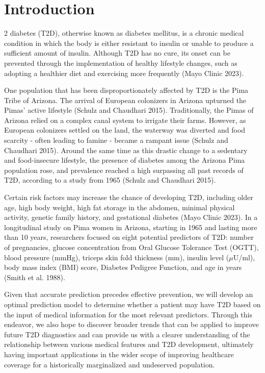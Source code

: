 \documentclass[journal]{IEEEtran}
\begin{document}
\IEEEpeerreviewmaketitle

\section{Introduction}
 2 diabetes (T2D), otherwise known as diabetes mellitus, is a chronic medical condition in which the body is either resistant to insulin or unable to produce a sufficient amount of insulin. Although T2D has no cure, its onset can be prevented through the implementation of healthy lifestyle changes, such as adopting a healthier diet and exercising more frequently (Mayo Clinic 2023).

One population that has been disproportionately affected by T2D is the Pima Tribe of Arizona. The arrival of European colonizers in Arizona upturned the Pimas' active lifestyle (Schulz and Chaudhari 2015). Traditionally, the Pimas of Arizona relied on a complex canal system to irrigate their farms. However, as European colonizers settled on the land, the waterway was diverted and food scarcity - often leading to famine - became a rampant issue (Schulz and Chaudhari 2015). Around the same time as this drastic change to a sedentary and food-insecure lifestyle, the presence of diabetes among the Arizona Pima population rose, and prevalence reached a high surpassing all past records of T2D, according to a study from 1965 (Schulz and Chaudhari 2015).

Certain risk factors may increase the chance of developing T2D, including older age, high body weight, high fat storage in the abdomen, minimal physical activity, genetic family history, and gestational diabetes (Mayo Clinic 2023). In a longitudinal study on Pima women in Arizona, starting in 1965 and lasting more than 10 years, researchers focused on eight potential predictors of T2D: number of pregnancies, glucose concentration from Oral Glucose Tolerance Test (OGTT), blood pressure (mmHg), triceps skin fold thickness (mm), insulin level ($\mu$U/ml), body mass index (BMI) score, Diabetes Pedigree Function, and age in years (Smith et al. 1988).

Given that accurate prediction precedes effective prevention, we will develop an optimal prediction model to determine whether a patient may have T2D based on the input of medical information for the most relevant predictors. Through this endeavor, we also hope to discover broader trends that can be applied to improve future T2D diagnostics and can provide us with a clearer understanding of the relationship between various medical features and T2D development, ultimately having important applications in the wider scope of improving healthcare coverage for a historically marginalized and undeserved population.
\end{document}
